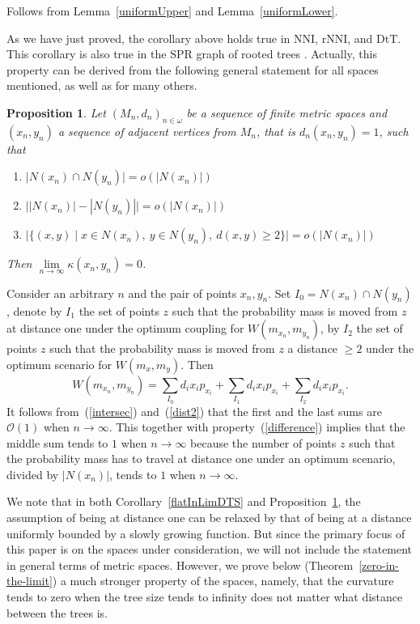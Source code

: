 \documentclass{amsart}
\newtheorem{proposition}[lemma]{Proposition}
\theoremstyle{definition}
\newcommand{\nni}{\mathrm{NNI}}
\newcommand{\rnni}{\mathrm{rNNI}}
\newcommand{\dtt}{\mathrm{DtT}}
\renewcommand{\O}{\mathcal{O}}
\begin{document}
{\proof
Follows from Lemma~\ref{uniformUpper} and Lemma~\ref{uniformLower}.
\endproof

As we have just proved, the corollary above holds true in $\nni$, $\rnni$, and $\dtt$.
This corollary is also true in the SPR graph of rooted trees \autocite{Whidden2015-es}.
Actually, this property can be derived from the following general statement for all spaces mentioned, as well as for many others.

\begin{proposition}\label{flatInLimGen}
Let $(M_n,d_n)_{n \in \omega}$ be a sequence of finite metric spaces and $(x_n, y_n)$ a sequence of adjacent vertices from $M_n$, that is $d_n(x_n,y_n) = 1$, such that
\begin{enumerate}[(1)]
\item\label{intersec} $\big|N(x_n) \cap N(y_n)\big| = o(|N(x_n)|)$
\item\label{difference} $\big||N(x_n)| - |N(y_n)|\big| = o(|N(x_n)|)$
\item\label{dist2} $\big|\{(x,y) \mid
	x \in N(x_n),~ y \in N(y_n),~ d(x, y) \geq 2\}\big| = o(|N(x_n)|)$
\end{enumerate}

Then $\lim\limits_{n \to \infty} \kappa(x_n, y_n) = 0$.
\end{proposition}

\proof
Consider an arbitrary $n$ and the pair of points $x_n,y_n$.
Set $I_0 = N(x_n) \cap N(y_n)$, denote by $I_1$ the set of points $z$ such that the probability mass is moved from $z$ at distance one under the optimum coupling for $W(m_{x_n},m_{y_n})$, by $I_2$ the set of points $z$ such that the probability mass is moved from $z$ a distance $\geq 2$ under the optimum scenario for $W(m_x,m_y)$.
Then
\[
W(m_{x_n},m_{y_n}) = \sum_{I_0} d_i x_i p_{x_i} + \sum_{I_1} d_i x_i p_{x_i} +
\sum_{I_2} d_i x_i p_{x_i}.
\]
It follows from~(\ref{intersec}) and~(\ref{dist2}) that the first and the last sums are $\O(1)$ when $n\to\infty$.
This together with property~(\ref{difference}) implies that the middle sum tends to $1$ when $n\to\infty$ because the number of points $z$ such that the probability mass has to travel at distance one under an optimum scenario, divided by $|N(x_n)|$, tends to $1$ when $n\to\infty$.
\endproof

We note that in both Corollary~\ref{flatInLimDTS} and Proposition~\ref{flatInLimGen}, the assumption of being at distance one can be relaxed by that of being at a distance uniformly bounded by a slowly growing function.
But since the primary focus of this paper is on the spaces under consideration, we will not  include the statement in general terms of metric spaces.
However, we prove below (Theorem~\ref{zero-in-the-limit}) a much stronger property of the spaces, namely, that the curvature tends to zero when the tree size tends to infinity does not matter what distance between the trees is.
}
{}
\end{document}
